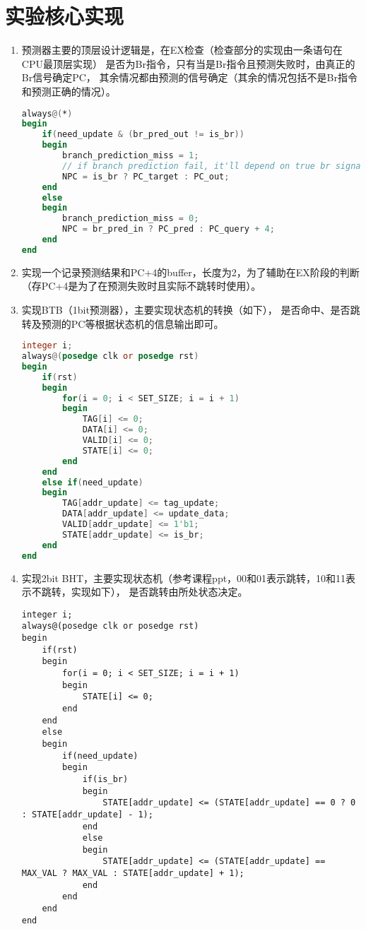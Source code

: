 \documentclass[UTF8]{article}
\begin{document}
    \section{实验核心实现}
    \begin{enumerate}
        \item 预测器主要的顶层设计逻辑是，在EX检查（检查部分的实现由一条语句在CPU最顶层实现）
        是否为Br指令，只有当是Br指令且预测失败时，由真正的Br信号确定PC，
        其余情况都由预测的信号确定（其余的情况包括不是Br指令和预测正确的情况）。
        \begin{lstlisting}[language=verilog]
always@(*)
begin
    if(need_update & (br_pred_out != is_br))
    begin
        branch_prediction_miss = 1;
        // if branch prediction fail, it'll depend on true br signal
        NPC = is_br ? PC_target : PC_out;
    end
    else
    begin
        branch_prediction_miss = 0;
        NPC = br_pred_in ? PC_pred : PC_query + 4;
    end
end
        \end{lstlisting}
        \item 实现一个记录预测结果和PC+4的buffer，长度为2，为了辅助在EX阶段的判断
        （存PC+4是为了在预测失败时且实际不跳转时使用）。
        \item 实现BTB（1bit预测器），主要实现状态机的转换（如下），
        是否命中、是否跳转及预测的PC等根据状态机的信息输出即可。
        \begin{lstlisting}[language=verilog]
integer i;
always@(posedge clk or posedge rst)
begin
    if(rst)
    begin
        for(i = 0; i < SET_SIZE; i = i + 1)
        begin
            TAG[i] <= 0;
            DATA[i] <= 0;
            VALID[i] <= 0;
            STATE[i] <= 0;
        end
    end
    else if(need_update)
    begin
        TAG[addr_update] <= tag_update;
        DATA[addr_update] <= update_data;
        VALID[addr_update] <= 1'b1;
        STATE[addr_update] <= is_br;
    end
end
        \end{lstlisting}
        \item 实现2bit BHT，主要实现状态机（参考课程ppt，00和01表示跳转，10和11表示不跳转，实现如下），
        是否跳转由所处状态决定。
        \begin{lstlisting}
integer i;
always@(posedge clk or posedge rst)
begin
    if(rst)
    begin
        for(i = 0; i < SET_SIZE; i = i + 1)
        begin
            STATE[i] <= 0;
        end
    end
    else
    begin
        if(need_update)
        begin
            if(is_br)
            begin
                STATE[addr_update] <= (STATE[addr_update] == 0 ? 0 : STATE[addr_update] - 1);
            end
            else
            begin
                STATE[addr_update] <= (STATE[addr_update] == MAX_VAL ? MAX_VAL : STATE[addr_update] + 1);
            end
        end
    end
end
        \end{lstlisting}
    \end{enumerate}
\end{document}
